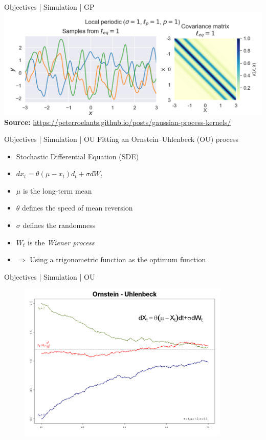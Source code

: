 \documentclass{beamer}
\begin{document}
    \begin{frame}{Objectives | Simulation | GP}
        \center
    	\includegraphics[width=1.0\textwidth]{img/local_periodic_kernel.png}
    	\textbf{Source:} \url{https://peterroelants.github.io/posts/gaussian-process-kernels/}
    \end{frame}
    
    \begin{frame}{Objectives | Simulation | OU}
        Fitting an Ornstein–Uhlenbeck (OU) process
        \begin{itemize}
            \item Stochastic Differential Equation (SDE)
            \item $dx_t = \theta (\mu - x_t)d_t + \sigma d W_t$
            \item $\mu$ is the long-term mean
            \item $\theta$ defines the speed of mean reversion
            \item $\sigma$ defines the randomness
            \item $W_t$ is the \textit{Wiener process}
            \item $\Rightarrow$ Using a trigonometric function as the optimum function
        \end{itemize}
    \end{frame}
    
    \begin{frame}{Objectives | Simulation | OU}
        \begin{figure}[hbt]
        	\center
        	\includegraphics[width=0.9\textwidth]{img/ou_process.png}
        	\label{fig:ou_process}
        \end{figure}
    \end{frame}
    
\end{document}
